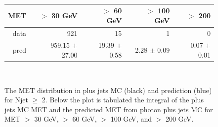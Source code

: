 \begin{figure}[hbt]
  \begin{center}
	\\ \medskip
    \begin{tabular}{r|r|r|r|r}
      MET        & $>$ 30 GeV       & $>$ 60 GeV        & $>$ 100 GeV       & $>$ 200  \\ \hline
	  data       &   921               &    15               &     1               &     0 \\
	  pred       & 959.15 $\pm$  27.00 &  19.39 $\pm$   0.58 &   2.28 $\pm$   0.09 &   0.07 $\pm$   0.01 \\
	  

    \end{tabular}
	\\ \medskip
    \caption{The MET distribution in \Z plus jets MC (black) and prediction (blue) for Njet $\ge$ 2. 
	  Below the plot is tabulated the integral of the \Z plus jets MC MET and the predicted 
	  MET from photon plus jets MC for 
	  MET $>$ 30 GeV, $>$ 60 GeV, $>$ 100 GeV, and $>$ 200 GeV. 
	}
    \label{fig:mcclosurepho}
  \end{center}
\end{figure}




